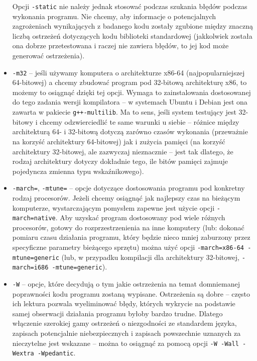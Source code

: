 \begin{itemize}
Opcji \texttt{-static} nie należy jednak stosować podczas szukania błędów
podczas wykonania programu. Nie chcemy, aby informacje o potencjalnych
zagrożeniach wynikających z badanego kodu zostały zgubione między znaczną
liczbą ostrzeżeń dotyczących kodu biblioteki standardowej (jakkolwiek została
ona dobrze przetestowana i raczej nie zawiera błędów, to jej kod może generować
ostrzeżenia).

\item \texttt{-m32} -- jeśli używamy komputera o architekturze x86-64
(najpopularniejszej 64-bitowej) a chcemy zbudować program pod 32-bitową
architekturę x86, to możemy to osiągnąć dzięki tej opcji. Wymaga to
zainstalowania dostosowanej do tego zadania wersji kompilatora -- w systemach
Ubuntu i Debian jest ona zawarta w pakiecie \texttt{g++-multilib}. Ma to sens,
jeśli system testujący jest 32-bitowy i chcemy odzwierciedlić te same warunki
u siebie -- różnice między architekturą 64- i 32-bitową dotyczą zarówno czasów
wykonania (przeważnie na korzyść architektury 64-bitowej) jak i zużycia pamięci
(na korzyść architektury 32-bitowej, ale zazwyczaj nieznacznie -- jest tak
dlatego, że rodzaj architektury dotyczy dokładnie tego, ile bitów pamięci
zajmuje pojedyncza zmienna typu wskaźnikowego).

\item \texttt{-march=}, \texttt{-mtune=} -- opcje dotyczące dostosowania
programu pod konkretny rodzaj procesorów. Jeżeli chcemy osiągnąć jak najlepszy
czas na bieżącym komputerze, wystarczającym pomysłem zapewne jest użycie
opcji \texttt{-march=native}. Aby uzyskać program dostosowany pod wiele różnych
procesorów, gotowy do rozprzestrzenienia na inne komputery (lub: dokonać
pomiaru czasu działania programu, który będzie nieco mniej zaburzony przez
specyficzne parametry bieżącego sprzętu) można użyć opcji
\texttt{-march=x86-64 -mtune=generic} (lub, w przypadku kompilacji dla
architektury 32-bitowej, \texttt{-march=i686 -mtune=generic}).

\item \texttt{-W} -- opcje, które decydują o tym jakie ostrzeżenia na temat
domniemanej poprawności kodu programu zostaną wypisane. Ostrzeżenia są dobre --
często ich lektura pozwala wyeliminować błędy, których wykrycie na podstawie
samej obserwacji działania programu byłoby bardzo trudne. Dlatego włączenie
szerokiej gamy ostrzeżeń o niezgodności ze standardem języka, zapisach
potencjalnie niebezpiecznych i zapisach powszechnie uznanych za nieczytelne jest
wskazane -- można to osiągnąć za pomocą opcji
\texttt{-W -Wall -Wextra -Wpedantic}.


\end{itemize}
